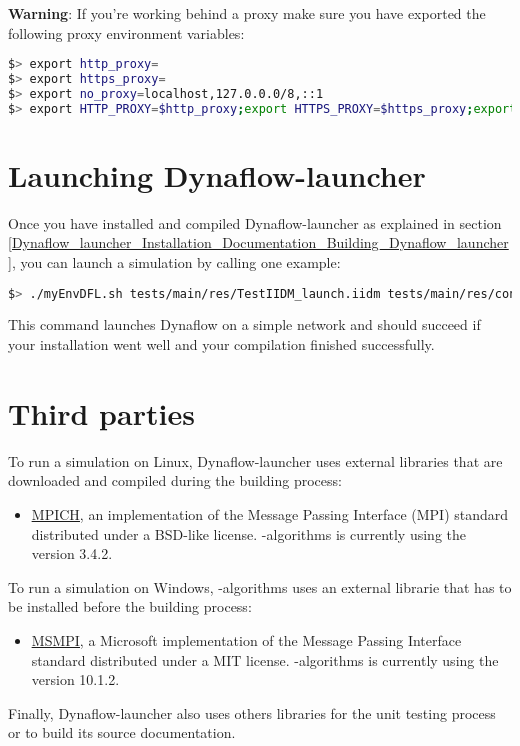 \documentclass[a4paper, 12pt]{report}
\begin{document}
\textbf{Warning}: If you're working behind a proxy make sure you have exported the following proxy environment variables:

\begin{lstlisting}[language=bash, columns=fullflexible]
$> export http_proxy=
$> export https_proxy=
$> export no_proxy=localhost,127.0.0.0/8,::1
$> export HTTP_PROXY=$http_proxy;export HTTPS_PROXY=$https_proxy;export NO_PROXY=$no_proxy;
\end{lstlisting}

\section[Launching Dynaflow-launcher]{Launching Dynaflow-launcher}

Once you have installed and compiled Dynaflow-launcher as explained in section \ref{Dynaflow_launcher_Installation_Documentation_Building_Dynaflow_launcher},
you can launch a simulation by calling one example:

\begin{lstlisting}[language=bash, breaklines=true, breakatwhitespace=false, columns=fullflexible]
$> ./myEnvDFL.sh tests/main/res/TestIIDM_launch.iidm tests/main/res/config_launch.json
\end{lstlisting}

This command launches Dynaflow on a simple network and should succeed if your installation went well and your compilation finished successfully.

\section{Third parties}

To run a simulation on Linux, Dynaflow-launcher uses external libraries that are downloaded and compiled during the building process:
\begin{itemize}
\item \href{https://www.mpich.org/}{\underline{MPICH}}, an implementation of the Message Passing Interface (MPI) standard distributed under a BSD-like license.
\Dynawo-algorithms is currently using the version 3.4.2.
\end{itemize}

To run a simulation on Windows, \Dynawo-algorithms uses an external librarie that has to be installed before the building process:
\begin{itemize}
\item \href{https://learn.microsoft.com/en-us/message-passing-interface/microsoft-mpi?redirectedfrom=MSDN}{\underline{MSMPI}}, a Microsoft implementation of the Message Passing Interface standard distributed under a MIT license.
\Dynawo-algorithms is currently using the version 10.1.2.
\end{itemize}

Finally, Dynaflow-launcher also uses others libraries for the unit testing process or to build its source documentation.
\end{document}
